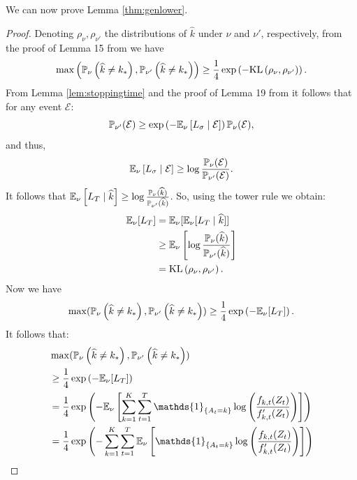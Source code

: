 We can now prove Lemma \ref{thm:genlower}.
\begin{proof}
    Denoting $\rho_\nu, \rho_{\nu'}$ the distributions of $\widehat{k}$ under $\nu$ and $\nu'$, respectively, from the proof of Lemma 15 from \citet{kaufmann2016complexity} we have
    \begin{equation}\max\left(\mathbb{P}_{\nu}\left(\widehat{k}\neq k_*\right), \mathbb{P}_{\nu'}\left(\widehat{k}\neq k_*\right)\right) \geq \frac{1}{4}\exp\left(-\mathrm{KL}\left(\rho_\nu, \rho_{\nu'}\right)\right).\end{equation} 
    From Lemma \ref{lem:stoppingtime} and the proof of Lemma 19 from \citet{kaufmann2016complexity} it follows that for any event $\mathcal{E}$:
    \begin{equation}\mathbb{P}_{\nu'}(\mathcal{E}) \geq \exp\left(-\mathbb{E}_{\nu}\left[L_{\sigma} \mid \mathcal{E}\right]\right)\mathbb{P}_{\nu}(\mathcal{E}),\end{equation}
    and thus,
    \begin{equation}\mathbb{E}_{\nu}\left[L_{\sigma} \mid \mathcal{E}\right] \geq \log \frac{\mathbb{P}_{\nu}(\mathcal{E})}{\mathbb{P}_{\nu'}(\mathcal{E})}.\end{equation}
    It follows that $\mathbb{E}_{\nu}\left[L_{T} \mid \widehat{k} \right] \geq \log \frac{\mathbb{P}_{\nu}(\widehat{k})}{\mathbb{P}_{\nu'}(\widehat{k})}$. So, using the tower rule we obtain:
    \begin{align*}
        \mathbb{E}_{\nu}[L_{T}] &= \mathbb{E}_{\nu}[\mathbb{E}_{\nu}[L_{T}\mid \widehat{k}]] \\
        &\geq \mathbb{E}_{\nu}\left[\log \frac{\mathbb{P}_{\nu}(\widehat{k})}{\mathbb{P}_{\nu'}(\widehat{k})}\right] \\
        &= \mathrm{KL}\left(\rho_\nu, \rho_{\nu'}\right).
    \end{align*}
Now we have \begin{equation}\max(\mathbb{P}_{\nu}\left(\widehat{k}\neq k_*\right), \mathbb{P}_{\nu'}\left(\widehat{k}\neq k_*\right)) \geq \frac{1}{4}\exp\left(-\mathbb{E}_{\nu}[L_{T}]\right).\end{equation}
    It follows that:
    \begin{align*}
        &\max(\P_{\nu}\Sp{\widehat{k}\neq k_*}, \P_{\nu'}\Sp{\widehat{k}\neq k_*}) \\&\geq 
        \frac{1}{4} \exp \left(-\E_{\nu}[L_T]\right)\\
        &=\frac{1}{4} \exp \left(-\E_{\nu}\left[\sum_{k=1}^K\sum_{t=1}^T\mathds{1}_{\Bp{A_t=k}}\log\Sp{\frac{f_{k, t}(Z_t)}{f_{k, t}'(Z_t)}} \right]\right) \\
        &= \frac{1}{4} \exp \left(-\sum_{k=1}^K\sum_{t=1}^T\E_{\nu}\left[\mathds{1}_{\Bp{A_t=k}}\log\Sp{\frac{f_{k, t}(Z_t)}{f_{k, t}'(Z_t)}} \right]\right) \\

\end{align*}
\end{proof}
